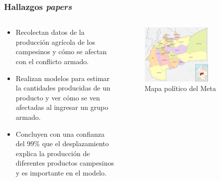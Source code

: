 \documentclass[17pt, t, lualatex]{beamer}
\begin{document}
\insertsectionpage

\begin{frame}[allowframebreaks]
  \frametitle{Hallazgos \textit{papers}}
  
  \begin{columns}
    \begin{column}{.5\textwidth}
      \begin{itemize}
        \item Recolectan datos de la producción agrícola de los campesinos y
              cómo se afectan con el conflicto armado.              
        \item Realizan modelos para estimar la cantidades producidas de un
              producto y ver cómo se ven afectadas al ingresar un grupo armado.
        \item Concluyen con una confianza del 99\% que el desplazamiento explica
              la producción de diferentes productos campesinos y es importante
              en el modelo.
      \end{itemize}
    \end{column}

    \begin{column}{.5\textwidth}
      \begin{figure}[ht]
        \centering
        \includegraphics[width=0.7\textwidth]{img/MapaMeta.png}
        \caption{\label{fig:p1f1} Mapa político del Meta \cite{eswiki:166396423}}
      \end{figure}

    \end{column}
  \end{columns}

\end{frame}
\end{document}
